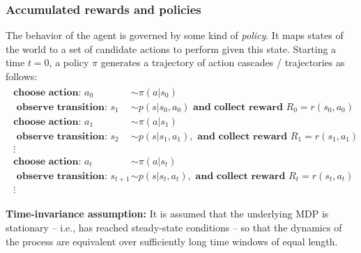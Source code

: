 \documentclass[10pt,letterpaper]{article}
\begin{document}
\subsubsection{Accumulated rewards and policies}
The behavior of the agent is governed by some kind of \textit{policy}.
It maps states of the world to
a set of candidate actions to perform given this state. Starting a time $t=0$,
a policy $\pi$ generates a trajectory of action cascades / trajectories as follows:
\begin{eqnarray*}
  \begin{split}
    \textbf{choose action: }a_0 &\sim \pi(a|s_0)\\
    \textbf{ observe transition: }s_1 &\sim p(s|s_0,a_0)\textbf{ and collect reward }R_0 = r(s_0, a_0)\\
    \textbf{choose action: }a_1 &\sim \pi(a|s_1)\\
    \textbf{ observe transition: }s_2 &\sim p(s|s_1,a_1), \textbf{ and collect reward }R_1 = r(s_1, a_1)\\
    \vdots\\
    \textbf{choose action: }a_{t} &\sim \pi(a|s_{t})\\
    \textbf{ observe transition: }s_{t+1} &\sim p(s|s_{t},a_{t}), \textbf{ and collect reward }R_{t} = r(s_{t}, a_{t})\\
    \vdots
  \end{split}
\end{eqnarray*}

\begin{mdframed}
\textbf{Time-invariance assumption:} It is assumed that the underlying MDP is stationary -- i.e., has reached steady-state conditions --
  so that the dynamics of the process are equivalent over sufficiently long time windows of equal length.
\end{mdframed}
\end{document}
